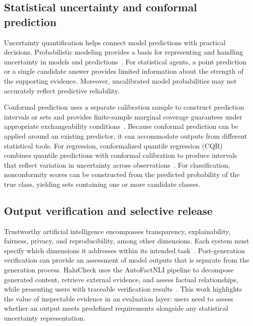 \documentclass[preprint,12pt,authoryear]{elsarticle}
\begin{document}
\subsection{Statistical uncertainty and conformal prediction}
\label{subsec:uncertainty_conformal}
Uncertainty quantification helps connect model predictions with practical decisions. Probabilistic modeling provides a basis for representing and handling uncertainty in models and predictions~\citep{ghahramani2015probabilistic}. For statistical agents, a point prediction or a single candidate answer provides limited information about the strength of the supporting evidence. Moreover, uncalibrated model probabilities may not accurately reflect predictive reliability.

Conformal prediction uses a separate calibration sample to construct prediction intervals or sets and provides finite-sample marginal coverage guarantees under appropriate exchangeability conditions~\citep{angelopoulos2023gentle}. Because conformal prediction can be applied around an existing predictor, it can accommodate outputs from different statistical tools. For regression, conformalized quantile regression (CQR) combines quantile predictions with conformal calibration to produce intervals that reflect variation in uncertainty across observations~\citep{romano2019cqr}. For classification, nonconformity scores can be constructed from the predicted probability of the true class, yielding sets containing one or more candidate classes.

\subsection{Output verification and selective release}
\label{subsec:verification_release}
Trustworthy artificial intelligence encompasses transparency, explainability, fairness, privacy, and reproducibility, among other dimensions. Each system must specify which dimensions it addresses within its intended task~\citep{li2023trustworthy}. Post-generation verification can provide an assessment of model outputs that is separate from the generation process. HaluCheck uses the AutoFactNLI pipeline to decompose generated content, retrieve external evidence, and assess factual relationships, while presenting users with traceable verification results~\citep{heo2025halucheck}. This work highlights the value of inspectable evidence in an evaluation layer: users need to assess whether an output meets predefined requirements alongside any statistical uncertainty representation.
\end{document}
